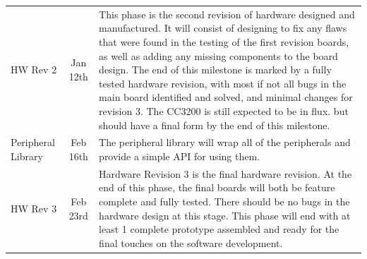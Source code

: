 \documentclass[letterpaper]{article}
\begin{document}
\begin{table}[htp!]
\begin{tabular}{lcp{}}
HW Rev 2 & Jan 12th & This phase is the second revision of hardware designed and manufactured. It will consist of designing to fix any flaws that were found in the testing of the first revision boards, as well as adding any missing components to the board design. The end of this milestone is marked by a fully tested hardware revision, with most if not all bugs in the main board identified and solved, and minimal changes for revision 3. The CC3200 is still expected to be in flux. but should have a final form by the end of this milestone.\\
Peripheral Library & Feb 16th & The peripheral library will wrap all of the peripherals and provide a simple API for using them. \\
HW Rev 3 & Feb 23rd & Hardware Revision 3 is the final hardware revision. At the end of this phase, the final boards will both be feature complete and fully tested. There should be no bugs in the hardware design at this stage. This phase will end with at least 1 complete prototype assembled and ready for the final touches on the software development.\\
\bottomrule
\end{tabular}
\end{table}
\end{document}

